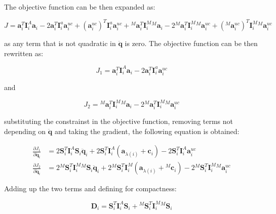 The objective function can be then expanded as:

\begin{equation}
    J = \mathbf{a} ^T _i \mathbf{I} ^A _i \mathbf{a} _i - 2\mathbf{a} ^T _i \mathbf{I} ^a _i \mathbf{a} ^{uc} _i + (\mathbf{a} ^{uc} _i) ^T \mathbf{I} ^a _i \mathbf{a} ^{uc} _i + {} ^M \mathbf{a} ^T _i \mathbf{I} ^M _i {} ^M \mathbf{a} _i - 2 {} ^M \mathbf{a} ^T _i \mathbf{I} ^M _i {} ^M \mathbf{a} ^{uc} _i + ({} ^M \mathbf{a} ^{uc} _i) ^T \mathbf{I} ^M _i {} ^M \mathbf{a} ^{uc} _i
\end{equation}

as any term that is not quadratic in $\ddot{\mathbf{q}}$ is zero. The objective function can be then rewritten as:

\begin{equation}
    J _1 = \mathbf{a} ^T _i \mathbf{I} ^A _i \mathbf{a} _i - 2\mathbf{a} ^T _i \mathbf{I} ^a _i \mathbf{a} ^{uc} _i
\end{equation}

and

\begin{equation}
    J _2 = {} ^M \mathbf{a} ^T _i \mathbf{I} ^M _i {} ^M \mathbf{a} _i - 2 {} ^M \mathbf{a} ^T _i \mathbf{I} ^M _i {} ^M \mathbf{a} ^{uc} _i
\end{equation}

substituting the constrainst in the objective function, removing terms not depending on $\ddot{\mathbf{q}}$ and taking the gradient, the following equation is obtained:

\begin{align}
    \frac{\partial J _1}{\partial \ddot{\mathbf{q}} _i} & = 2 \mathbf{S} ^T _i \mathbf{I} ^A _i \mathbf{S} _i \ddot{\mathbf{q}} _i + 2 \mathbf{S} ^T _i \mathbf{I} ^A _i (\mathbf{a} _{\lambda (i)} + \mathbf{c} _i) - 2 \mathbf{S} ^T _i \mathbf{I} ^A _i \mathbf{a} ^{uc} _i \nonumber                                        \\
    \frac{\partial J _2}{\partial \ddot{\mathbf{q}} _i} & = 2 {} ^M \mathbf{S} ^T _i \mathbf{I} ^M _i {} ^M \mathbf{S} _i \ddot{\mathbf{q}} _i + 2 {} ^M  \mathbf{S} ^T _i \mathbf{I} ^M _i (\mathbf{a} _{\lambda (i)} + {} ^M  \mathbf{c} _i) - 2 {} ^M \mathbf{S} ^T _i \mathbf{I} ^M _i {} ^M \mathbf{a} ^{uc} _i  \nonumber
\end{align}

Adding up the two terms and defining for compactness:

\begin{equation}
    \mathbf{D} _i = \mathbf{S} ^T _i \mathbf{I} ^A _i \mathbf{S} _i + {} ^M \mathbf{S} ^T _i \mathbf{I} ^M _i {} ^M \mathbf{S} _i
\end{equation}

